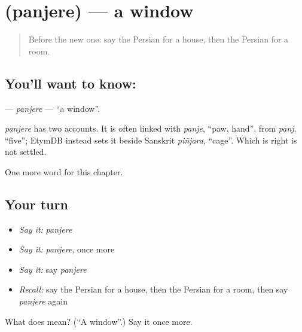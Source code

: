 \section[\texorpdfstring{\fa{پنجره} (panjere)}{پنجره (panjere)}]{ (panjere) — a window}

\label{lesson:FA-C45-panjere}



\begin{quote}
Before the new one: say the Persian for a house, then the Persian for a room.
\end{quote}

\subsection*{You'll want to know: }
\textbf{} — \emph{panjere} — \textquotedblleft{}a window\textquotedblright{}.

\begin{cousinweb}
\emph{panjere} has two accounts. It is often linked with \emph{panje}, \textquotedblleft{}paw, hand\textquotedblright{}, from \emph{panj}, \textquotedblleft{}five\textquotedblright{}; EtymDB instead sets it beside Sanskrit \emph{piñjara}, \textquotedblleft{}cage\textquotedblright{}. Which is right is not settled.
\end{cousinweb}

\begin{grammarlens}[title={What you've built}]
One more word for this chapter.
\end{grammarlens}

\subsection*{Your turn}
\begin{itemize}
\raggedright
  \item \emph{Say it:} \emph{panjere}
  \item \emph{Say it:} \emph{panjere}, once more
  \item \emph{Say it:} say \emph{panjere}
  \item \emph{Recall:} say the Persian for a house, then the Persian for a room, then say \emph{panjere} again
\end{itemize}

\begin{tcolorbox}[breakable,colback=teal!4,colframe=teal!35!black,title={Before you move on}]
What does  mean? (\textquotedblleft{}A window\textquotedblright{}.) Say it once more.
\end{tcolorbox}
